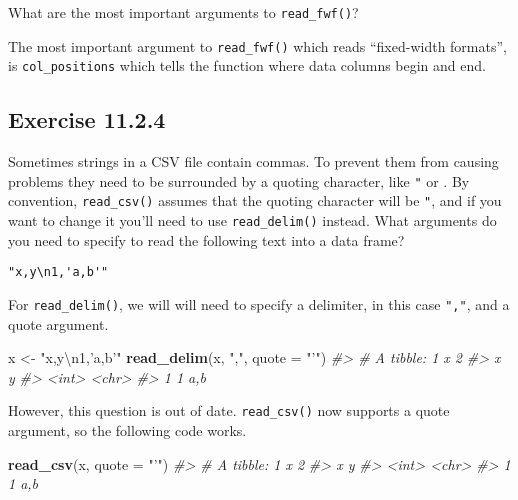 \documentclass[]{book}
\newenvironment{Shaded}{\begin{snugshade}}{\end{snugshade}}
\newcommand{\CharTok}[1]{\textcolor[rgb]{0.31,0.60,0.02}{#1}}
\newcommand{\CommentTok}[1]{\textcolor[rgb]{0.56,0.35,0.01}{\textit{#1}}}
\newcommand{\DataTypeTok}[1]{\textcolor[rgb]{0.13,0.29,0.53}{#1}}
\newcommand{\KeywordTok}[1]{\textcolor[rgb]{0.13,0.29,0.53}{\textbf{#1}}}
\newcommand{\NormalTok}[1]{#1}
\newcommand{\StringTok}[1]{\textcolor[rgb]{0.31,0.60,0.02}{#1}}
\theoremstyle{plain}
\theoremstyle{remark}
\theoremstyle{definition}
\theoremstyle{definition}
\theoremstyle{definition}
\theoremstyle{remark}
\begin{document}
What are the most important arguments to \texttt{read\_fwf()}?

The most important argument to \texttt{read\_fwf()} which reads
``fixed-width formats'', is \texttt{col\_positions} which tells the
function where data columns begin and end.

\hypertarget{exercise-11.2.4}{%
\subsection*{\texorpdfstring{Exercise
{11.2.4}}{Exercise 11.2.4}}\label{exercise-11.2.4}}

Sometimes strings in a CSV file contain commas. To prevent them from
causing problems they need to be surrounded by a quoting character, like
\texttt{"} or \texttt{\textquotesingle{}}. By convention,
\texttt{read\_csv()} assumes that the quoting character will be
\texttt{"}, and if you want to change it you'll need to use
\texttt{read\_delim()} instead. What arguments do you need to specify to
read the following text into a data frame?

\begin{verbatim}
"x,y\n1,'a,b'"
\end{verbatim}

For \texttt{read\_delim()}, we will will need to specify a delimiter, in
this case \texttt{","}, and a quote argument.

\begin{Shaded}
\begin{Highlighting}[]
\NormalTok{x <-}\StringTok{ "x,y}\CharTok{\textbackslash{}n}\StringTok{1,'a,b'"}
\KeywordTok{read_delim}\NormalTok{(x, }\StringTok{","}\NormalTok{, }\DataTypeTok{quote =} \StringTok{"'"}\NormalTok{)}
\CommentTok{#> # A tibble: 1 x 2}
\CommentTok{#>       x y    }
\CommentTok{#>   <int> <chr>}
\CommentTok{#> 1     1 a,b}
\end{Highlighting}
\end{Shaded}

However, this question is out of date. \texttt{read\_csv()} now supports
a quote argument, so the following code works.

\begin{Shaded}
\begin{Highlighting}[]
\KeywordTok{read_csv}\NormalTok{(x, }\DataTypeTok{quote =} \StringTok{"'"}\NormalTok{)}
\CommentTok{#> # A tibble: 1 x 2}
\CommentTok{#>       x y    }
\CommentTok{#>   <int> <chr>}
\CommentTok{#> 1     1 a,b}
\end{Highlighting}
\end{Shaded}
\end{document}
